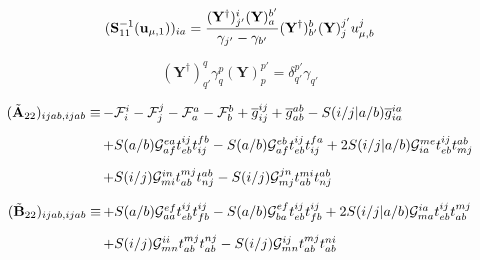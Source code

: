 \begin{subappendices}
\begin{equation}
    (\mathbf{S}_{11}^{-1}(\mathbf{u}_{\mu,1}))_{ia}
    =
    \frac{%
        (\mathbf{Y}^\dagger)_{j'}^i
        (\mathbf{Y})_a^{b'}
    }{%
        \gamma_{j'}-\gamma_{b'}
    }
    (\mathbf{Y}^\dagger)_{b'}^b
    (\mathbf{Y})_j^{j'}
    u_{\mu,b}^j
\end{equation}

\begin{equation}
    (\mathbf{Y}^\dagger)_{q'}^q
    \gamma_q^p
    (\mathbf{Y})_p^{p'}
    =
    \delta_{q'}^{p'}
    \gamma_{q'}
\end{equation}

\begin{equation}
    \begin{array}{r@{\,}l}
        (\tilde{\mathbf{A}}_{22})_{ijab,ijab}
        \equiv
        &
        -
        \mathcal{F}_i^i
        -
        \mathcal{F}_j^j
        -
        \mathcal{F}_a^a
        -
        \mathcal{F}_b^b
        +
        \overline{g}_{ij}^{ij}
        +
        \overline{g}_{ab}^{ab}
        -
        S(i/j|a/b)
        \overline{g}_{ia}^{ia}
        \\[10pt]
        &
        +
        S(a/b)
        \mathcal{G}_{af}^{ea}
        t_{eb}^{ij}
        t_{ij}^{fb}
        -
        S(a/b)
        \mathcal{G}_{af}^{eb}
        t_{eb}^{ij}
        t_{ij}^{fa}
        +
        2
        S(i/j|a/b)
        \mathcal{G}_{ia}^{me}
        t_{eb}^{ij}
        t_{mj}^{ab}
        \\[10pt]
        &
        +
        S(i/j)
        \mathcal{G}_{mi}^{in}
        t_{ab}^{mj}
        t_{nj}^{ab}
        -
        S(i/j)
        \mathcal{G}_{mj}^{jn}
        t_{ab}^{mi}
        t_{nj}^{ab}
    \end{array}
\end{equation}

\begin{equation}
    \begin{array}{r@{\,}l}
        (\tilde{\mathbf{B}}_{22})_{ijab,ijab}
        \equiv
        &
        +
        S(a/b)
        \mathcal{G}_{aa}^{ef}
        t_{eb}^{ij}
        t_{fb}^{ij}
        -
        S(a/b)
        \mathcal{G}_{ba}^{ef}
        t_{eb}^{ij}
        t_{fb}^{ij}
        +
        2
        S(i/j|a/b)
        \mathcal{G}_{ma}^{ia}
        t_{eb}^{ij}
        t_{ab}^{mj}
        \\[10pt]
        &
        +
        S(i/j)
        \mathcal{G}_{mn}^{ii}
        t_{ab}^{mj}
        t_{ab}^{nj}
        -
        S(i/j)
        \mathcal{G}_{mn}^{ij}
        t_{ab}^{mj}
        t_{ab}^{ni}
    \end{array}
\end{equation}

\end{subappendices}
